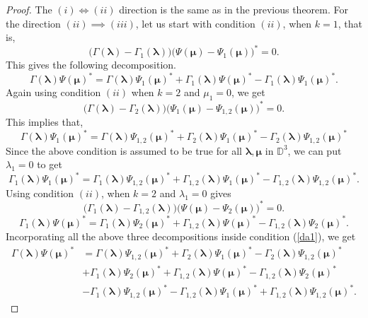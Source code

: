 \documentclass[10pt,a4paper]{amsart}
\newcommand{\D}{\mathbb{D}}
\begin{document}
\begin{proof}
The $(i) \iff (ii)$ direction is the same as in the previous theorem.  For the direction $(ii) \implies (iii)$, let us start with condition $(ii)$, when $k=1$, that is,
\[
\big( \Gamma(\bm{\lambda}) - \Gamma_1(\bm{\lambda}) \big) \big( \Psi(\bm{\mu}) - \Psi_1(\bm{\mu}) \big)^* = 0.
\]
This gives the following decomposition.
\begin{equation}\label{da1}
\Gamma(\bm{\lambda})  \Psi(\bm{\mu})^* =  \Gamma(\bm{\lambda}) \Psi_1(\bm{\mu})^* + \Gamma_1(\bm{\lambda})\Psi(\bm{\mu})^* - \Gamma_1(\bm{\lambda}) \Psi_1(\bm{\mu})^*.
\end{equation}
Again using condition $(ii)$ when $k=2$ and $\mu_1 = 0$, we get
\[
\big( \Gamma(\bm{\lambda}) - \Gamma_2(\bm{\lambda}) \big) \big( \Psi_{1}(\bm{\mu}) - \Psi_{1,2}(\bm{\mu}) \big)^* = 0.
\]
This implies that,
\[
 \Gamma(\bm{\lambda}) \Psi_1(\bm{\mu})^* =   \Gamma(\bm{\lambda}) \Psi_{1,2}(\bm{\mu})^* + \Gamma_2(\bm{\lambda}) \Psi_1(\bm{\mu})^* - \Gamma_2(\bm{\lambda}) \Psi_{1,2}(\bm{\mu})^* 
\]
Since the above condition is assumed to be true for all $\bm{\lambda}, \bm{\mu}$ in $\D^3$, we can put $\lambda_1 = 0$ to get
\[
\Gamma_1(\bm{\lambda}) \Psi_{1}(\bm{\mu})^* = \Gamma_1(\bm{\lambda}) \Psi_{1,2}(\bm{\mu})^*
+ \Gamma_{1,2}(\bm{\lambda})  \Psi_{1}(\bm{\mu})^* - \Gamma_{1,2}(\bm{\lambda}) \Psi_{1,2}(\bm{\mu})^*.
\]
Using condition $(ii)$, when $k=2$ and $\lambda_1 = 0$ gives
\[
\big( \Gamma_1(\bm{\lambda}) - \Gamma_{1,2}(\bm{\lambda}) \big) \big( \Psi(\bm{\mu}) - \Psi_{2}(\bm{\mu}) \big)^* = 0.
\]
\begin{equation*}
\Gamma_1(\bm{\lambda})\Psi(\bm{\mu})^* =  \Gamma_1(\bm{\lambda})\Psi_2(\bm{\mu})^* + \Gamma_{1,2}(\bm{\lambda}) \Psi(\bm{\mu})^* - \Gamma_{1,2}(\bm{\lambda}) \Psi_{2}(\bm{\mu})^*.
\end{equation*}
Incorporating all the above three decompositions inside condition (\ref{da1}), we get
\begin{equation}\label{da2}
\begin{split}
\Gamma(\bm{\lambda})  \Psi(\bm{\mu})^* &=  \Gamma(\bm{\lambda}) \Psi_{1,2}(\bm{\mu})^* + \Gamma_2(\bm{\lambda}) \Psi_1(\bm{\mu})^* - \Gamma_2(\bm{\lambda}) \Psi_{1,2}(\bm{\mu})^* \\
&+ \Gamma_1(\bm{\lambda})\Psi_2(\bm{\mu})^* + \Gamma_{1,2}(\bm{\lambda}) \Psi(\bm{\mu})^* - \Gamma_{1,2}(\bm{\lambda}) \Psi_{2}(\bm{\mu})^* \\
&- \Gamma_1(\bm{\lambda}) \Psi_{1,2}(\bm{\mu})^*
- \Gamma_{1,2}(\bm{\lambda})  \Psi_{1}(\bm{\mu})^* + \Gamma_{1,2}(\bm{\lambda}) \Psi_{1,2}(\bm{\mu})^*.

\end{split}
\end{equation}
\end{proof}
\end{document}
